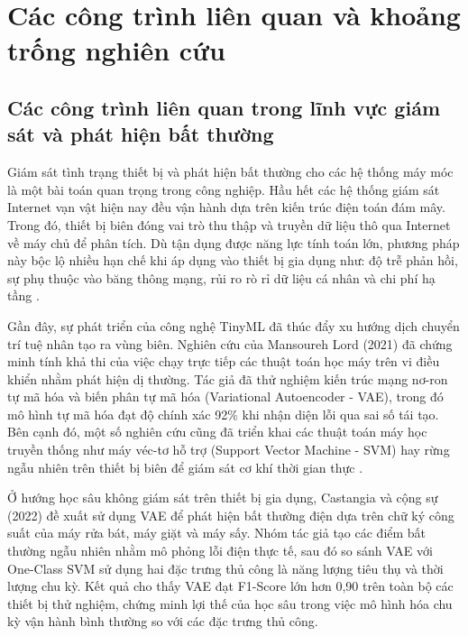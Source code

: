 ﻿

\section{Các công trình liên quan và khoảng trống nghiên cứu}

\subsection{Các công trình liên quan trong lĩnh vực giám sát và phát hiện bất thường}

Giám sát tình trạng thiết bị và phát hiện bất thường cho các hệ thống máy móc là một bài toán quan trọng trong công nghiệp. Hầu hết các hệ thống giám sát Internet vạn vật hiện nay đều vận hành dựa trên kiến trúc điện toán đám mây. Trong đó, thiết bị biên đóng vai trò thu thập và truyền dữ liệu thô qua Internet về máy chủ để phân tích. Dù tận dụng được năng lực tính toán lớn, phương pháp này bộc lộ nhiều hạn chế khi áp dụng vào thiết bị gia dụng như: độ trễ phản hồi, sự phụ thuộc vào băng thông mạng, rủi ro rò rỉ dữ liệu cá nhân và chi phí hạ tầng \cite{ref_1_1, ref_1_4}.

Gần đây, sự phát triển của công nghệ TinyML đã thúc đẩy xu hướng dịch chuyển trí tuệ nhân tạo ra vùng biên. Nghiên cứu của Mansoureh Lord (2021) \cite{ref_1_lord} đã chứng minh tính khả thi của việc chạy trực tiếp các thuật toán học máy trên vi điều khiển nhằm phát hiện dị thường. Tác giả đã thử nghiệm kiến trúc mạng nơ-ron tự mã hóa và biến phân tự mã hóa (Variational Autoencoder - VAE), trong đó mô hình tự mã hóa đạt độ chính xác 92\% khi nhận diện lỗi qua sai số tái tạo. Bên cạnh đó, một số nghiên cứu cũng đã triển khai các thuật toán máy học truyền thống như máy véc-tơ hỗ trợ (Support Vector Machine - SVM) hay rừng ngẫu nhiên trên thiết bị biên để giám sát cơ khí thời gian thực \cite{ref_1_7}. 

Ở hướng học sâu không giám sát trên thiết bị gia dụng, Castangia và cộng sự (2022) \cite{ref_castangia_2022} đề xuất sử dụng VAE để phát hiện bất thường điện dựa trên chữ ký công suất của máy rửa bát, máy giặt và máy sấy. Nhóm tác giả tạo các điểm bất thường ngẫu nhiên nhằm mô phỏng lỗi điện thực tế, sau đó so sánh VAE với One-Class SVM sử dụng hai đặc trưng thủ công là năng lượng tiêu thụ và thời lượng chu kỳ. Kết quả cho thấy VAE đạt F1-Score lớn hơn 0,90 trên toàn bộ các thiết bị thử nghiệm, chứng minh lợi thế của học sâu trong việc mô hình hóa chu kỳ vận hành bình thường so với các đặc trưng thủ công.

